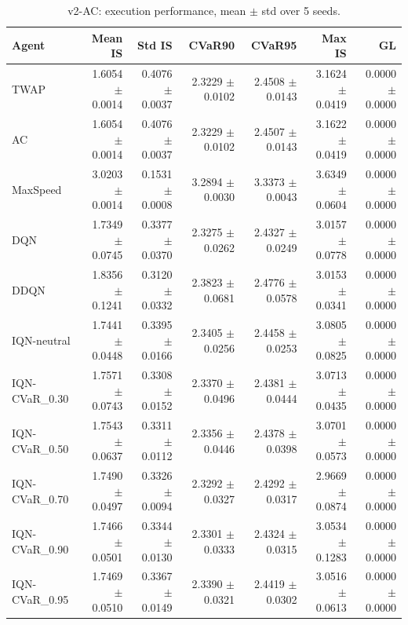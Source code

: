 \begin{table}[H]
    \centering
    \caption{v2-AC: execution performance, mean $\pm$ std over 5 seeds.}
    \label{tab:v2_ac_aggregate}
    \begin{tabular}{@{}lrrrrrr@{}}
        \toprule
        Agent & Mean IS & Std IS & CVaR90 & CVaR95 & Max IS & GL \\
        \midrule
        TWAP & 1.6054 $\pm$ 0.0014 & 0.4076 $\pm$ 0.0037 & 2.3229 $\pm$ 0.0102 & 2.4508 $\pm$ 0.0143 & 3.1624 $\pm$ 0.0419 & 0.0000 $\pm$ 0.0000 \\
        AC & 1.6054 $\pm$ 0.0014 & 0.4076 $\pm$ 0.0037 & 2.3229 $\pm$ 0.0102 & 2.4507 $\pm$ 0.0143 & 3.1622 $\pm$ 0.0419 & 0.0000 $\pm$ 0.0000 \\
        MaxSpeed & 3.0203 $\pm$ 0.0014 & 0.1531 $\pm$ 0.0008 & 3.2894 $\pm$ 0.0030 & 3.3373 $\pm$ 0.0043 & 3.6349 $\pm$ 0.0604 & 0.0000 $\pm$ 0.0000 \\
        DQN & 1.7349 $\pm$ 0.0745 & 0.3377 $\pm$ 0.0370 & 2.3275 $\pm$ 0.0262 & 2.4327 $\pm$ 0.0249 & 3.0157 $\pm$ 0.0778 & 0.0000 $\pm$ 0.0000 \\
        DDQN & 1.8356 $\pm$ 0.1241 & 0.3120 $\pm$ 0.0332 & 2.3823 $\pm$ 0.0681 & 2.4776 $\pm$ 0.0578 & 3.0153 $\pm$ 0.0341 & 0.0000 $\pm$ 0.0000 \\
        IQN-neutral & 1.7441 $\pm$ 0.0448 & 0.3395 $\pm$ 0.0166 & 2.3405 $\pm$ 0.0256 & 2.4458 $\pm$ 0.0253 & 3.0805 $\pm$ 0.0825 & 0.0000 $\pm$ 0.0000 \\
        IQN-CVaR\_0.30 & 1.7571 $\pm$ 0.0743 & 0.3308 $\pm$ 0.0152 & 2.3370 $\pm$ 0.0496 & 2.4381 $\pm$ 0.0444 & 3.0713 $\pm$ 0.0435 & 0.0000 $\pm$ 0.0000 \\
        IQN-CVaR\_0.50 & 1.7543 $\pm$ 0.0637 & 0.3311 $\pm$ 0.0112 & 2.3356 $\pm$ 0.0446 & 2.4378 $\pm$ 0.0398 & 3.0701 $\pm$ 0.0573 & 0.0000 $\pm$ 0.0000 \\
        IQN-CVaR\_0.70 & 1.7490 $\pm$ 0.0497 & 0.3326 $\pm$ 0.0094 & 2.3292 $\pm$ 0.0327 & 2.4292 $\pm$ 0.0317 & 2.9669 $\pm$ 0.0874 & 0.0000 $\pm$ 0.0000 \\
        IQN-CVaR\_0.90 & 1.7466 $\pm$ 0.0501 & 0.3344 $\pm$ 0.0130 & 2.3301 $\pm$ 0.0333 & 2.4324 $\pm$ 0.0315 & 3.0534 $\pm$ 0.1283 & 0.0000 $\pm$ 0.0000 \\
        IQN-CVaR\_0.95 & 1.7469 $\pm$ 0.0510 & 0.3367 $\pm$ 0.0149 & 2.3390 $\pm$ 0.0321 & 2.4419 $\pm$ 0.0302 & 3.0516 $\pm$ 0.0613 & 0.0000 $\pm$ 0.0000 \\
        \bottomrule
    \end{tabular}
\end{table}
